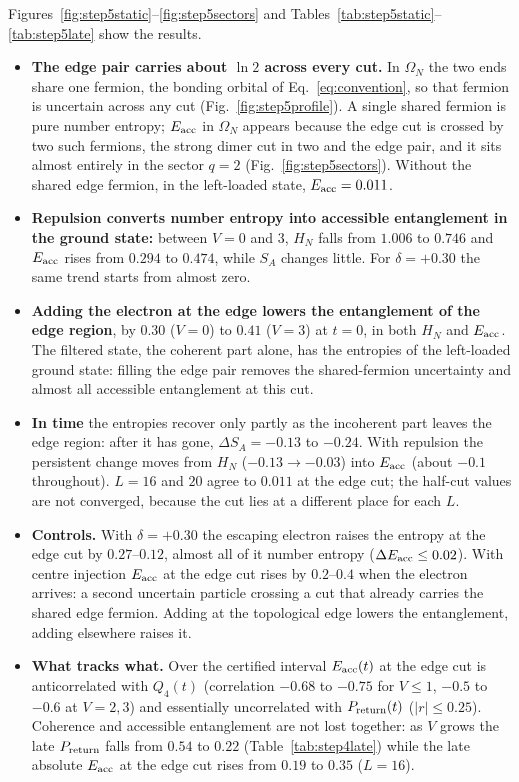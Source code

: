\documentclass[11pt,a4paper]{article}
\begin{document}
Figures~\ref{fig:step5static}--\ref{fig:step5sectors} and Tables~\ref{tab:step5static}--\ref{tab:step5late} show the results.
\begin{itemize}
  \item \textbf{The edge pair carries about $\ln2$ across every cut.} In $\Omega_N$ the two ends share one fermion, the bonding orbital of Eq.~\eqref{eq:convention}, so that fermion is uncertain across any cut (Fig.~\ref{fig:step5profile}). A single shared fermion is pure number entropy; $E_{\rm acc}$ in $\Omega_N$ appears because the edge cut is crossed by two such fermions, the strong dimer cut in two and the edge pair, and it sits almost entirely in the sector $q=2$ (Fig.~\ref{fig:step5sectors}). Without the shared edge fermion, in the left-loaded state, $E_{\rm acc}=0.011$.
  \item \textbf{Repulsion converts number entropy into accessible entanglement in the ground state:} between $V=0$ and $3$, $H_N$ falls from $1.006$ to $0.746$ and $E_{\rm acc}$ rises from $0.294$ to $0.474$, while $S_A$ changes little. For $\delta=+0.30$ the same trend starts from almost zero.
  \item \textbf{Adding the electron at the edge lowers the entanglement of the edge region}, by $0.30$ ($V=0$) to $0.41$ ($V=3$) at $t=0$, in both $H_N$ and $E_{\rm acc}$. The filtered state, the coherent part alone, has the entropies of the left-loaded ground state: filling the edge pair removes the shared-fermion uncertainty and almost all accessible entanglement at this cut.
  \item \textbf{In time} the entropies recover only partly as the incoherent part leaves the edge region: after it has gone, $\Delta S_A=-0.13$ to $-0.24$. With repulsion the persistent change moves from $H_N$ ($-0.13\to-0.03$) into $E_{\rm acc}$ (about $-0.1$ throughout). $L=16$ and $20$ agree to $0.011$ at the edge cut; the half-cut values are not converged, because the cut lies at a different place for each $L$.
  \item \textbf{Controls.} With $\delta=+0.30$ the escaping electron raises the entropy at the edge cut by $0.27$--$0.12$, almost all of it number entropy ($\Delta E_{\rm acc}\le0.02$). With centre injection $E_{\rm acc}$ at the edge cut rises by $0.2$--$0.4$ when the electron arrives: a second uncertain particle crossing a cut that already carries the shared edge fermion. Adding at the topological edge lowers the entanglement, adding elsewhere raises it.
  \item \textbf{What tracks what.} Over the certified interval $E_{\rm acc}(t)$ at the edge cut is anticorrelated with $Q_4(t)$ (correlation $-0.68$ to $-0.75$ for $V\le1$, $-0.5$ to $-0.6$ at $V=2,3$) and essentially uncorrelated with $P_{\rm return}(t)$ ($|r|\le0.25$). Coherence and accessible entanglement are not lost together: as $V$ grows the late $P_{\rm return}$ falls from $0.54$ to $0.22$ (Table~\ref{tab:step4late}) while the late absolute $E_{\rm acc}$ at the edge cut rises from $0.19$ to $0.35$ ($L=16$).
\end{itemize}
\end{document}

